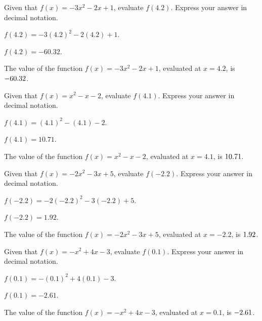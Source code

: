 \begin{shuffle}
\begin{exercise}
Given that $f(x)=-3 x^2-2 x+1$, evaluate $f(4.2)$. Express your answer in decimal notation.
\begin{solution}
\begin{hint}
$f(4.2)=-3 (4.2)^2-2 (4.2)+1$.
\end{hint}
\begin{hint}
$f(4.2)=-60.32$.
\end{hint}
The value of the function $f(x) = -3 x^2-2 x+1$, evaluated at $x=4.2$, is ${-60.32}$.
\end{solution}
\end{exercise}

\begin{exercise}
Given that $f(x)=x^2-x-2$, evaluate $f(4.1)$. Express your answer in decimal notation.
\begin{solution}
\begin{hint}
$f(4.1)=(4.1)^2-(4.1)-2$.
\end{hint}
\begin{hint}
$f(4.1)=10.71$.
\end{hint}
The value of the function $f(x) = x^2-x-2$, evaluated at $x=4.1$, is ${10.71}$.
\end{solution}
\end{exercise}

\begin{exercise}
Given that $f(x)=-2 x^2-3 x+5$, evaluate $f(-2.2)$. Express your answer in decimal notation.
\begin{solution}
\begin{hint}
$f(-2.2)=-2 (-2.2)^2-3 (-2.2)+5$.
\end{hint}
\begin{hint}
$f(-2.2)=1.92$.
\end{hint}
The value of the function $f(x) = -2 x^2-3 x+5$, evaluated at $x=-2.2$, is ${1.92}$.
\end{solution}
\end{exercise}

\begin{exercise}
Given that $f(x)=-x^2+4 x-3$, evaluate $f(0.1)$. Express your answer in decimal notation.
\begin{solution}
\begin{hint}
$f(0.1)=-(0.1)^2+4 (0.1)-3$.
\end{hint}
\begin{hint}
$f(0.1)=-2.61$.
\end{hint}
The value of the function $f(x) = -x^2+4 x-3$, evaluated at $x=0.1$, is ${-2.61}$.
\end{solution}
\end{exercise}


\end{shuffle}
